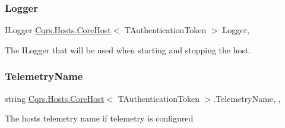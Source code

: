 \subsubsection{\texorpdfstring{Logger}{Logger}}
{\footnotesize\ttfamily I\+Logger \hyperlink{classCqrs_1_1Hosts_1_1CoreHost}{Cqrs.\+Hosts.\+Core\+Host}$<$ T\+Authentication\+Token $>$.Logger\hspace{0.3cm}{\ttfamily [get]}, {\ttfamily [protected]}}



The I\+Logger that will be used when starting and stopping the host. 

\mbox{\label{classCqrs_1_1Hosts_1_1CoreHost_a098b8ab87f83dd6519e36b9838fd6e2e_a098b8ab87f83dd6519e36b9838fd6e2e}} 
\subsubsection{\texorpdfstring{Telemetry\+Name}{TelemetryName}}
{\footnotesize\ttfamily string \hyperlink{classCqrs_1_1Hosts_1_1CoreHost}{Cqrs.\+Hosts.\+Core\+Host}$<$ T\+Authentication\+Token $>$.Telemetry\+Name\hspace{0.3cm}{\ttfamily [get]}, {\ttfamily [set]}, {\ttfamily [protected]}}



The hosts telemetry name if telemetry is configured 

